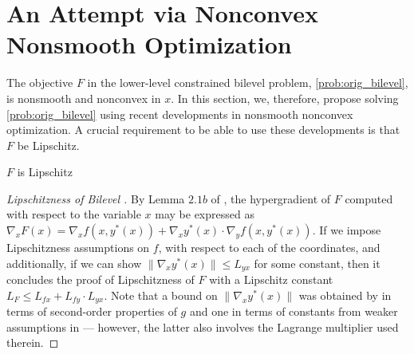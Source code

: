 
\section{An Attempt via Nonconvex Nonsmooth Optimization}\label{sec:ncns_blackbox}
The objective $F$ in the lower-level constrained bilevel problem, \cref{prob:orig_bilevel},
is nonsmooth and nonconvex in $x$. In this section, we, therefore, propose solving \cref{prob:orig_bilevel} using recent developments in nonsmooth nonconvex optimization. A crucial requirement to be able to use these developments is that $F$ be Lipschitz. 
\begin{lemma}\label{lem:LipscConstrBilevel}
$F$ is Lipschitz
\end{lemma}
\begin{proof}[Lipschitzness of Bilevel ]
    By Lemma $2.1b$ of \cite{ghadimi2018approximation}, the hypergradient of $F$ computed with respect to the variable $x$ may be expressed as $\nabla_x F(x) = \nabla_x f(x, y^\ast(x)) + \nabla_x y^\ast(x) \cdot \nabla_y f(x, y^\ast(x))$. If we impose Lipschitzness assumptions on $f$, with respect to each of the coordinates, and additionally, if we can show $\|\nabla_x y^\ast(x)\|\leq L_{yx}$ for some constant, then it concludes the proof of Lipschitzness of $F$ with a Lipschitz constant $L_F \leq L_{fx} + L_{fy}\cdot L_{yx}$. Note that a bound on $\|\nabla_x y^\ast(x)\|$ was obtained by \cite{ghadimi2018approximation} in terms of second-order properties of $g$ and one in terms of constants from weaker assumptions in \cite{kwon2023fully} --- however, the latter also involves the Lagrange multiplier used therein.  
\end{proof}
